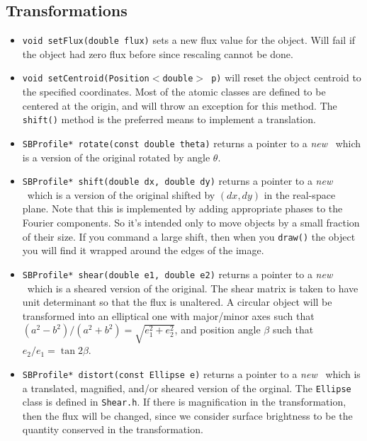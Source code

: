 \documentclass[11pt,preprint,flushrt]{aastex}
\begin{document}
\subsection{Transformations}
\begin{itemize}
\item {\tt void setFlux(double flux)} sets a new flux value for the object.  Will fail if the object had zero flux before since rescaling cannot be done.
\item {\tt void setCentroid(Position$<$double$>$ p)} will reset the object centroid to the specified coordinates.  Most of the atomic classes are defined to be centered at the origin, and will throw an exception for this method.  The {\tt shift()} method is the preferred means to implement a translation.
\item {\tt SBProfile* rotate(const double theta)} returns a pointer to a {\em new} \sbp\ which is a version of the original rotated by angle $\theta$.
\item {\tt SBProfile* shift(double dx, double dy)} returns a pointer to a {\em new} \sbp\ which is a version of the original shifted by $(dx,dy)$ in the real-space plane.  Note that this is implemented by adding appropriate phases to the Fourier components.  So it's intended only to move objects by a small fraction of their size.  If you command a large shift, then when you {\tt draw()} the object you will find it wrapped around the edges of the image.
\item {\tt SBProfile* shear(double e1, double e2)} returns a pointer to a {\em new} \sbp\ which is a sheared version of the original.  The shear matrix is taken to have unit determinant so that the flux is unaltered.  A circular object will be transformed into an elliptical one with major/minor axes such that $(a^2-b^2)/(a^2+b^2)=\sqrt{e_1^2+e_2^2}$, and position angle $\beta$ such that $e_2/e_1=\tan 2\beta$.
\item {\tt SBProfile* distort(const Ellipse e)} returns a pointer to a {\em new} \sbp\ which is a translated, magnified, and/or sheared version of the orginal.  The {\tt Ellipse} class is defined in {\tt Shear.h}.  If there is magnification in the transformation, then the flux will be changed, since we consider surface brightness to be the quantity conserved in the transformation.
\end{itemize}
\end{document}
